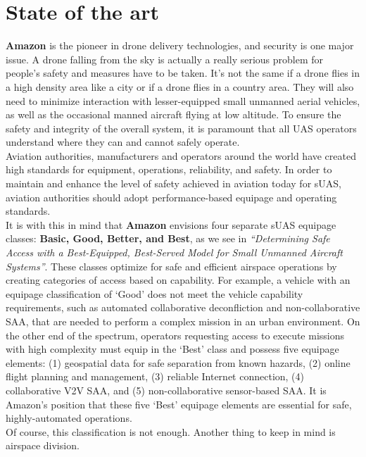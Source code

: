 \documentclass[conference]{IEEEtran}
\begin{document}
\section{State of the art}

\textbf{Amazon} is the pioneer in drone delivery technologies, and security is one major issue. A drone falling from the sky is actually a really serious problem for people's safety and measures have to be taken. It's not the same if a drone flies in a high density area like a city or if a drone flies in a country area. 
They will also need to minimize interaction with lesser-equipped small unmanned aerial vehicles, as well as the occasional manned aircraft flying at low altitude. To ensure the safety and integrity of the overall system, it is paramount that all UAS operators understand where they can and cannot safely operate.\\

Aviation authorities, manufacturers and operators around the world have created high standards for equipment, operations, reliability, and safety. In order to maintain and enhance the level of safety achieved in aviation today for sUAS, aviation authorities should adopt performance-based equipage and operating standards.\\

It is with this in mind that \textbf{Amazon} envisions four separate sUAS equipage classes: \textbf{Basic, Good, Better, and Best}, as we see in \textit{``Determining Safe Access with a Best-Equipped, Best-Served Model for Small Unmanned Aircraft Systems''}. These classes optimize for safe and efficient airspace operations by creating categories of access based on capability. For example, a vehicle with an equipage classification of ‘Good’ does not meet the vehicle capability requirements, such as automated collaborative deconfliction and non-collaborative SAA, that are needed to perform a complex mission in an urban environment. On the other end of the spectrum, operators requesting access to execute missions with high complexity must equip in the `Best' class and possess five equipage elements: (1) geospatial data for safe separation from known hazards, (2) online flight planning and management, (3) reliable Internet connection, (4) collaborative V2V SAA, and (5) non-collaborative sensor-based SAA. It is Amazon's position that these five `Best' equipage elements are essential for safe, highly-automated operations.\\

Of course, this classification is not enough. Another thing to keep in mind is airspace division.
\end{document}
